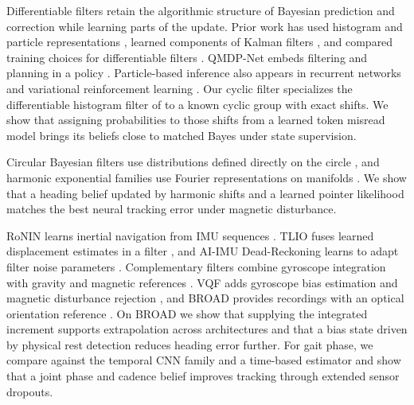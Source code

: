 Differentiable filters retain the algorithmic structure of Bayesian prediction
and correction while learning parts of the update. Prior work has used
histogram and particle representations
\citep{jonschkowski2016histogram,jonschkowski2018dpf}, learned components of
Kalman filters \citep{haarnoja2016backprop,revach2022kalmannet}, and compared
training choices for differentiable filters \citep{kloss2021differentiable}.
QMDP-Net embeds filtering and planning in a policy
\citep{karkus2017qmdpnet}. Particle-based inference also appears in recurrent
networks and variational reinforcement learning
\citep{ma2020pfrnn,igl2018dvrl}. Our cyclic filter specializes the differentiable
histogram filter of \citet{jonschkowski2016histogram} to a known cyclic group
with exact shifts. We show that assigning probabilities to those shifts from
a learned token misread model brings its beliefs close to matched Bayes under
state supervision.

Circular Bayesian filters use distributions defined directly on the circle
\citep{kurz2016circular}, and harmonic exponential families use Fourier
representations on manifolds \citep{cohen2015harmonic}. We show that a heading
belief updated by harmonic shifts and a learned pointer likelihood matches the
best neural tracking error under magnetic disturbance.

RoNIN learns inertial navigation from IMU sequences \citep{herath2020ronin}.
TLIO fuses learned displacement estimates in a filter \citep{liu2020tlio},
and AI-IMU Dead-Reckoning learns to adapt filter noise parameters
\citep{brossard2020aiimu}. Complementary filters combine gyroscope integration
with gravity and magnetic references \citep{mahony2008complementary}. VQF adds
gyroscope bias estimation and magnetic disturbance rejection
\citep{laidig2023vqf}, and BROAD provides recordings with an optical orientation
reference \citep{laidig2021broad}. On BROAD we show that supplying the
integrated increment supports extrapolation across architectures and that a
bias state driven by physical rest detection reduces heading error further.
For gait phase, we compare against the temporal CNN family \citep{kang2021gait}
and a time-based estimator and show that a joint phase and cadence belief
improves tracking through extended sensor dropouts.
